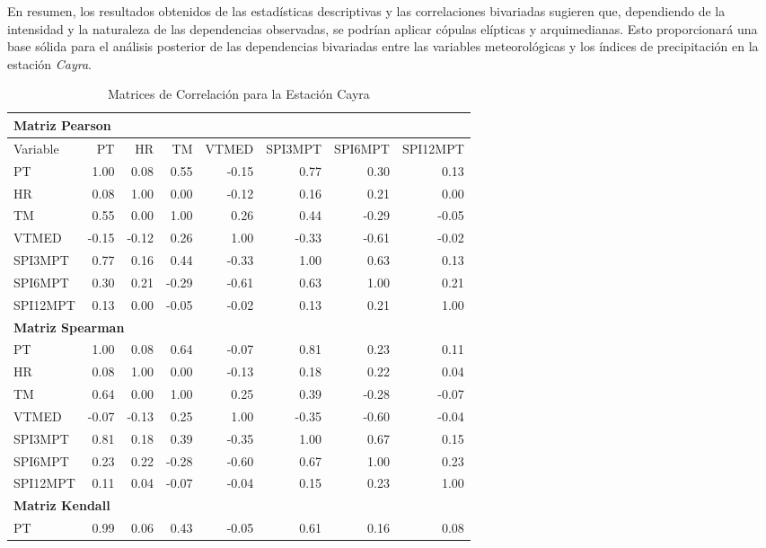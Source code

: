 En resumen, los resultados obtenidos de las estadísticas descriptivas y las correlaciones bivariadas sugieren que, dependiendo de la intensidad y la naturaleza de las dependencias observadas, se podrían aplicar cópulas elípticas y arquimedianas. Esto proporcionará una base sólida para el análisis posterior de las dependencias bivariadas entre las variables meteorológicas y los índices de precipitación en la estación \textit{Cayra}.


\begin{table}[ht]
\centering
\caption{Matrices de Correlación para la Estación Cayra}
\begin{tabular}{lrrrrrrr}
\toprule
\multicolumn{8}{l}{\textbf{Matriz Pearson}} \\
\midrule
Variable & PT & HR & TM & VTMED & SPI3MPT & SPI6MPT & SPI12MPT \\
\midrule
PT       & 1.00 & 0.08 & 0.55 & -0.15 & 0.77 & 0.30 & 0.13 \\
HR       & 0.08 & 1.00 & 0.00 & -0.12 & 0.16 & 0.21 & 0.00 \\
TM       & 0.55 & 0.00 & 1.00 & 0.26 & 0.44 & -0.29 & -0.05 \\
VTMED    & -0.15 & -0.12 & 0.26 & 1.00 & -0.33 & -0.61 & -0.02 \\
SPI3MPT  & 0.77 & 0.16 & 0.44 & -0.33 & 1.00 & 0.63 & 0.13 \\
SPI6MPT  & 0.30 & 0.21 & -0.29 & -0.61 & 0.63 & 1.00 & 0.21 \\
SPI12MPT & 0.13 & 0.00 & -0.05 & -0.02 & 0.13 & 0.21 & 1.00 \\
\midrule
\multicolumn{8}{l}{\textbf{Matriz Spearman}} \\
\midrule
PT       & 1.00 & 0.08 & 0.64 & -0.07 & 0.81 & 0.23 & 0.11 \\
HR       & 0.08 & 1.00 & 0.00 & -0.13 & 0.18 & 0.22 & 0.04 \\
TM       & 0.64 & 0.00 & 1.00 & 0.25 & 0.39 & -0.28 & -0.07 \\
VTMED    & -0.07 & -0.13 & 0.25 & 1.00 & -0.35 & -0.60 & -0.04 \\
SPI3MPT  & 0.81 & 0.18 & 0.39 & -0.35 & 1.00 & 0.67 & 0.15 \\
SPI6MPT  & 0.23 & 0.22 & -0.28 & -0.60 & 0.67 & 1.00 & 0.23 \\
SPI12MPT & 0.11 & 0.04 & -0.07 & -0.04 & 0.15 & 0.23 & 1.00 \\
\midrule
\multicolumn{8}{l}{\textbf{Matriz Kendall}} \\
\midrule
PT       & 0.99 & 0.06 & 0.43 & -0.05 & 0.61 & 0.16 & 0.08 \\

\end{tabular}
\end{table}
